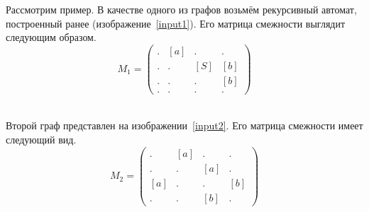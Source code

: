 \begin{example}
Рассмотрим пример.
В качестве одного из графов возьмём рекурсивный автомат, построенный ранее (изображение~\ref{input1}).
Его матрица смежности выглядит следующим образом.
\[ M_1 =
\begin{pmatrix}
. & [a] & . & . \\
. & . & [S] & [b] \\
. & . & . & [b] \\
. & . & . & .
\end{pmatrix}
\]

\begin{align}
\label{input2}
    
\end{align}

Второй граф представлен на изображении~\ref{input2}.
Его матрица смежности имеет следующий вид.
\[ M_2 =
\begin{pmatrix}
. & [a] & . & . \\
. & . & [a] & . \\
[a] & . & . & [b] \\
. & . & [b] & .
\end{pmatrix}
\]


\end{example}

